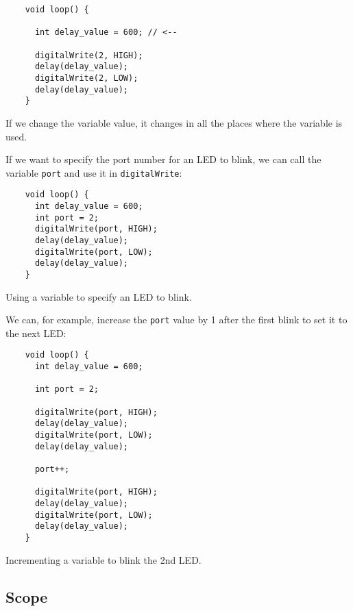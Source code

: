\documentclass[../sparc.tex]{subfiles}
\begin{document}
\begin{listing}[ht]
  \begin{verbatim}
    void loop() {

      int delay_value = 600; // <--

      digitalWrite(2, HIGH);
      delay(delay_value);
      digitalWrite(2, LOW);
      delay(delay_value);
    }
  \end{verbatim}
  \label{listing:dialogues-with-computer-variable-set-value}
  \caption{If we change the variable value, it changes in all the places where
    the variable is used.}
\end{listing}

If we want to specify the port number for an LED to blink, we can call the
variable \texttt{port} and use it in \texttt{digitalWrite}:

\begin{listing}[ht]
  \begin{verbatim}
    void loop() {
      int delay_value = 600;
      int port = 2;
      digitalWrite(port, HIGH);
      delay(delay_value);
      digitalWrite(port, LOW);
      delay(delay_value);
    }
  \end{verbatim}
  \label{listing:dialogues-with-computer-variable-set-value}
  \caption{Using a variable to specify an LED to blink.}
\end{listing}

We can, for example, increase the \texttt{port} value by 1 after the first blink
to set it to the next LED:

\begin{listing}[ht]
  \begin{verbatim}
    void loop() {
      int delay_value = 600;

      int port = 2;

      digitalWrite(port, HIGH);
      delay(delay_value);
      digitalWrite(port, LOW);
      delay(delay_value);

      port++;

      digitalWrite(port, HIGH);
      delay(delay_value);
      digitalWrite(port, LOW);
      delay(delay_value);
    }
  \end{verbatim}
  \label{listing:dialogues-with-computer-variable-increment-value}
  \caption{Incrementing a variable to blink the 2nd LED.}
\end{listing}

\subsection{Scope}
\end{document}
